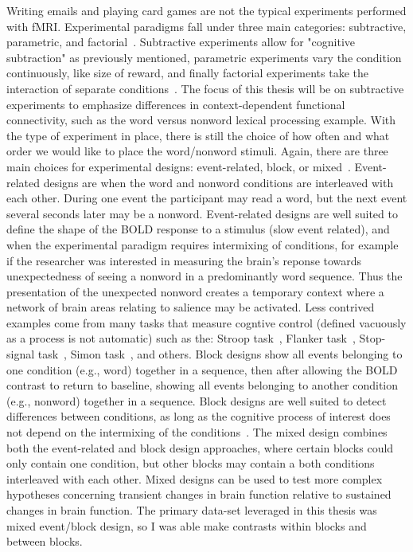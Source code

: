 \documentclass[phd,appendix,figures]{uithesis}
\begin{document}
Writing emails and playing card games are not the typical experiments performed with fMRI.
Experimental paradigms fall under three main categories: subtractive, parametric, and factorial~\cite{Friston1994}.
Subtractive experiments allow for "cognitive subtraction" as previously mentioned,
parametric experiments vary the condition continuously, like size of reward, and finally
factorial experiments take the interaction of separate conditions~\cite{Friston1994}.
The focus of this thesis will be on subtractive experiments to emphasize differences
in context-dependent functional connectivity, such as the word versus nonword lexical processing example.
With the type of experiment in place, there is still the choice of how often and
what order we would like to place the word/nonword stimuli.
Again, there are three main choices for experimental designs:
event-related, block, or mixed~\cite{Friston1995b,Buckner1996,Petersen2012}.
Event-related designs are when the word and nonword conditions are interleaved with each other.
During one event the participant may read a word, but the next event several seconds later may be
a nonword.
Event-related designs are well suited to define the shape of the BOLD response to a stimulus (slow event related),
and when the experimental paradigm requires intermixing of conditions, for example if the researcher
was interested in measuring the brain's reponse towards unexpectedness of seeing a nonword
in a predominantly word sequence.
Thus the presentation of the unexpected nonword creates a temporary context where a network of brain areas relating
to salience may be activated.
Less contrived examples come from many tasks that measure cogntive control (defined vacuously
as a process is not automatic) such as the: Stroop task~\cite{Stroop1935},
Flanker task~\cite{Eriksen1974a}, Stop-signal task~\cite{Logan1982},
Simon task~\cite{Simon1963}, and others.
Block designs show all events belonging to one condition (e.g., word) together in a sequence,
then after allowing the BOLD contrast to return to baseline, showing all events belonging
to another condition (e.g., nonword) together in a sequence.
Block designs are well suited to detect differences between conditions, as long as the cognitive process of interest
does not depend on the intermixing of the conditions~\cite{Friston1999}.
The mixed design combines both the event-related and block design approaches, where certain blocks
could only contain one condition, but other blocks may contain a both conditions interleaved with each other.
Mixed designs can be used to test more complex hypotheses concerning transient changes in brain function
relative to sustained changes in brain function.
The primary data-set leveraged in this thesis was mixed event/block design, so I was
able make contrasts within blocks and between blocks.
\end{document}
